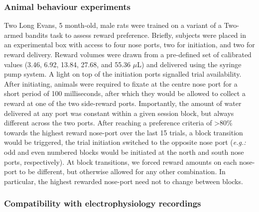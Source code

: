 \subsubsection*{Animal behaviour experiments}
Two Long Evans, 5 month-old, male rats were trained on a variant of a Two-armed bandits task \citep{Ito2009} to assess reward preference. Briefly, subjects were placed in an experimental box with access to four nose ports, two for initiation, and two for reward delivery. Reward volumes were drawn from a pre-defined set of calibrated values (3.46, 6.92, 13.84, 27.68, and 55.36 $\mu$L) and delivered using the syringe pump system. A light on top of the initiation ports signalled trial availability. After initiating, animals were required to fixate at the centre nose port for a short period of 100 milliseconds, after which they would be allowed to collect a reward at one of the two side-reward ports. Importantly, the amount of water delivered at any port was constant within a given session block, but always different across the two ports. After reaching a preference criteria of >80\% towards the highest reward nose-port over the last 15 trials, a block transition would be triggered, the trial initiation switched to the opposite nose port (\textit{e.g.:} odd and even numbered blocks would be initiated at the north and south nose ports, respectively). At block transitions, we forced reward amounts on each nose-port to be different, but otherwise allowed for any other combination. In particular, the highest rewarded nose-port need not to change between blocks.


\subsubsection*{Compatibility with electrophysiology recordings}

